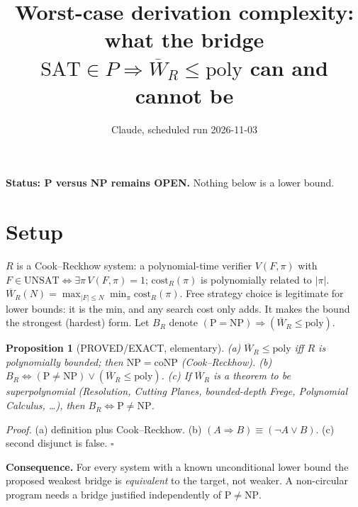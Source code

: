 \documentclass{article}
\newtheorem{prop}{Proposition}
\begin{document}
\title{Worst-case derivation complexity: what the bridge $\mathrm{SAT}\in P\Rightarrow \overline W_R\le \mathrm{poly}$ can and cannot be}
\author{Claude, scheduled run 2026-11-03}\date{}\maketitle
\noindent\textbf{Status: P versus NP remains OPEN.} Nothing below is a lower bound.

\section*{Setup}
$R$ is a Cook--Reckhow system: a polynomial-time verifier $V(F,\pi)$ with $F\in\mathrm{UNSAT}\iff\exists\pi\,V(F,\pi)=1$; $\mathrm{cost}_R(\pi)$ is polynomially related to $|\pi|$. $\overline W_R(N)=\max_{|F|\le N}\min_\pi \mathrm{cost}_R(\pi)$. Free strategy choice is legitimate for lower bounds: it is the min, and any search cost only adds. It makes the bound the strongest (hardest) form.
Let $B_R$ denote $(\mathrm{P}=\mathrm{NP})\Rightarrow(\overline W_R\le\mathrm{poly})$.

\begin{prop}[PROVED/EXACT, elementary]
(a) $\overline W_R\le\mathrm{poly}$ iff $R$ is polynomially bounded; then $\mathrm{NP}=\mathrm{coNP}$ (Cook--Reckhow).
(b) $B_R\iff(\mathrm P\neq\mathrm{NP})\lor(\overline W_R\le\mathrm{poly})$.
(c) If $\overline W_R$ is a theorem to be superpolynomial (Resolution, Cutting Planes, bounded-depth Frege, Polynomial Calculus, \dots), then $B_R\iff \mathrm P\ne\mathrm{NP}$.
\end{prop}
\emph{Proof.} (a) definition plus Cook--Reckhow. (b) $(A\Rightarrow B)\equiv(\lnot A\lor B)$. (c) second disjunct is false. $\square$

\textbf{Consequence.} For every system with a known unconditional lower bound the proposed weakest bridge is \emph{equivalent} to the target, not weaker. A non-circular program needs a bridge justified independently of $\mathrm P\ne\mathrm{NP}$.
\end{document}
